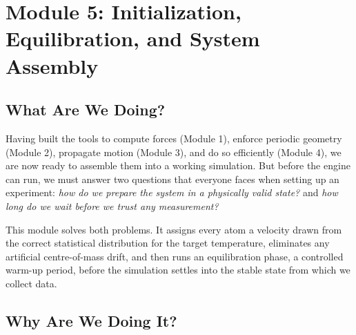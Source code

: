 %
\newpage
\section{Module 5: Initialization, Equilibration, and System Assembly}\label{sec:mod5}

\subsection{What Are We Doing?}

Having built the tools to compute forces (Module 1), enforce periodic geometry (Module 2), propagate motion (Module 3), and do so efficiently (Module 4), we are now ready to assemble them into a working simulation. But before the engine can run, we must answer two questions that everyone faces when setting up an experiment: \emph{how do we prepare the system in a physically valid state?} and \emph{how long do we wait before we trust any measurement?}

This module solves both problems. It assigns every atom a velocity drawn from the correct statistical distribution for the target temperature, eliminates any artificial centre-of-mass drift, and then runs an equilibration phase, a controlled warm-up period, before the simulation settles into the stable state from which we collect data.

\subsection{Why Are We Doing It?}

